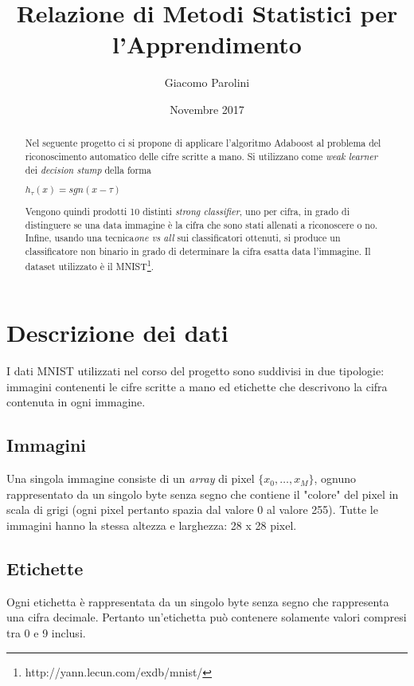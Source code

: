 \documentclass[12pt, letterpaper]{article}
\title{Relazione di Metodi Statistici per l'Apprendimento}
\author{Giacomo Parolini}
\date{Novembre 2017}
\begin{document}
\begin{titlepage}
\maketitle
\end{titlepage}

\tableofcontents
\pagebreak

\begin{abstract}
\noindent
Nel seguente progetto ci si propone di applicare l'algoritmo Adaboost al problema del riconoscimento automatico delle cifre scritte a mano. 
Si utilizzano come {\it weak learner} dei {\it decision stump} della forma
\begin{center}
	\( h_\tau(x) = sgn(x - \tau) \)
\end{center}
Vengono quindi prodotti 10 distinti {\it strong classifier}, uno per cifra, in grado di distinguere se una data immagine \`e la cifra che sono stati allenati a riconoscere o no. Infine, usando una tecnica{\it one vs all} sui classificatori ottenuti, si produce un classificatore non binario in grado di determinare la cifra esatta data l'immagine.
Il dataset utilizzato \`e il MNIST\footnote{http://yann.lecun.com/exdb/mnist/}.
\end{abstract}


\section{Descrizione dei dati} \label{sec:data}
I dati MNIST utilizzati nel corso del progetto sono suddivisi in due tipologie: immagini contenenti le cifre scritte a mano ed etichette che descrivono la cifra contenuta in ogni immagine.

\subsection{Immagini}
Una singola immagine consiste di un {\it array} di pixel \(\{x_0, \dotsc, x_M\}\), ognuno rappresentato da un singolo byte senza segno che contiene il "colore" del pixel in scala di grigi (ogni pixel pertanto spazia dal valore 0 al valore 255). Tutte le immagini hanno la stessa altezza e larghezza: 28 x 28 pixel.

\subsection{Etichette}
Ogni etichetta \`e rappresentata da un singolo byte senza segno che rappresenta una cifra decimale. Pertanto un'etichetta pu\`o contenere solamente valori compresi tra 0 e 9 inclusi.
\end{document}
